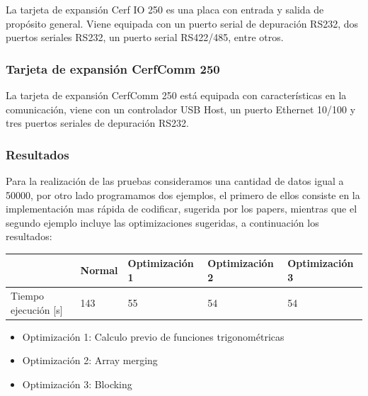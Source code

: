 	La tarjeta de expansi\'on Cerf IO 250 es una placa con entrada y salida
de propósito general. Viene equipada con un puerto serial de depuraci\'on RS232,
dos puertos seriales RS232, un puerto serial RS422/485, entre otros.

\subsubsection{Tarjeta de expansi\'on CerfComm 250}

	La tarjeta de expansi\'on CerfComm 250 est\'a equipada con caracter\'isticas
en la comunicaci\'on, viene con un controlador USB Host, un puerto Ethernet  10/100
 y tres puertos seriales de depuraci\'on RS232.

\subsubsection{Resultados}

	Para la realización de las pruebas consideramos una cantidad de datos 
igual a 50000, por otro lado programamos dos ejemplos, el primero de ellos consiste 
en la implementación mas rápida de codificar, sugerida por los papers, mientras 
que el segundo ejemplo incluye las optimizaciones sugeridas,
a continuación los resultados:\\

\begin{tabular}{|l|l|l|l|l|}
\hline
& Normal & Optimización 1 & Optimización 2 & Optimización 3 \\
\hline
Tiempo ejecución [s] & 143 & 55 & 54 & 54\\
\hline
\end{tabular}

\begin{itemize}
	\item Optimización 1: Calculo previo de funciones trigonométricas
	\item Optimización 2: Array merging
	\item Optimización 3: Blocking
\end{itemize}


